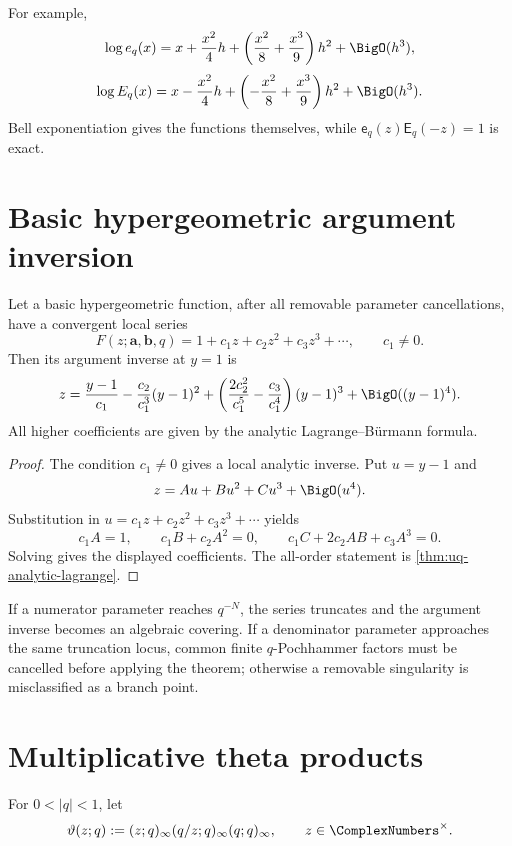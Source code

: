 For example,
\[
  \log e_q(x)
  =x+\frac{x^2}{4}h+
   \left(\frac{x^2}{8}+\frac{x^3}{9}\right)h^2+\BigO(h^3),
\]
\[
  \log E_q(x)
  =x-\frac{x^2}{4}h+
   \left(-\frac{x^2}{8}+\frac{x^3}{9}\right)h^2+\BigO(h^3).
\]
Bell exponentiation gives the functions themselves, while
\(\mathsf e_q(z)\mathsf E_q(-z)=1\) is exact.

\section{Basic hypergeometric argument inversion}
\label{sec:qs-hypergeometric}

\begin{theorem}
\label{thm:qs-hypergeometric-inverse}
Let a basic hypergeometric function, after all removable parameter
cancellations, have a convergent local series
\[
  F(z;\bm a,\bm b,q)
  =1+c_1z+c_2z^2+c_3z^3+\cdots,
  \qquad c_1\ne0.
\]
Then its argument inverse at \(y=1\) is
\[
  z=\frac{y-1}{c_1}
   -\frac{c_2}{c_1^3}(y-1)^2
   +\left(\frac{2c_2^2}{c_1^5}-\frac{c_3}{c_1^4}\right)(y-1)^3
   +\BigO((y-1)^4).
\]
All higher coefficients are given by the analytic Lagrange--Bürmann formula.
\end{theorem}

\begin{proof}
The condition \(c_1\ne0\) gives a local analytic inverse.  Put
\(u=y-1\) and
\[
  z=A u+B u^2+C u^3+\BigO(u^4).
\]
Substitution in \(u=c_1z+c_2z^2+c_3z^3+\cdots\) yields
\[
  c_1A=1,\qquad
  c_1B+c_2A^2=0,\qquad
  c_1C+2c_2AB+c_3A^3=0.
\]
Solving gives the displayed coefficients.  The all-order statement is
\cref{thm:uq-analytic-lagrange}.
\end{proof}

If a numerator parameter reaches \(q^{-N}\), the series truncates and the
argument inverse becomes an algebraic covering.  If a denominator parameter
approaches the same truncation locus, common finite \(q\)-Pochhammer factors
must be cancelled before applying the theorem; otherwise a removable
singularity is misclassified as a branch point.

\section{Multiplicative theta products}
\label{sec:qs-theta}

For \(0<|q|<1\), let
\[
  \vartheta(z;q)
  :=(z;q)_\infty(q/z;q)_\infty(q;q)_\infty,
  \qquad z\in\ComplexNumbers^\times.
\]

